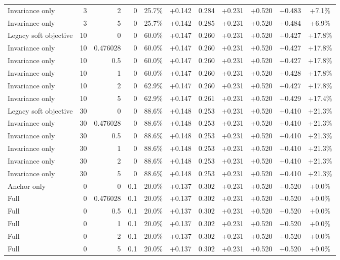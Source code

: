 \begin{table}[htbp]
\begin{tabular}{lrrrccccccc}
Invariance only & 3 & 2 & 0 & 25.7\% & +0.142 & 0.284 & +0.231 & +0.520 & +0.483 & +7.1\% \\
Invariance only & 3 & 5 & 0 & 25.7\% & +0.142 & 0.285 & +0.231 & +0.520 & +0.484 & +6.9\% \\
Legacy soft objective & 10 & 0 & 0 & 60.0\% & +0.147 & 0.260 & +0.231 & +0.520 & +0.427 & +17.8\% \\
Invariance only & 10 & 0.476028 & 0 & 60.0\% & +0.147 & 0.260 & +0.231 & +0.520 & +0.427 & +17.8\% \\
Invariance only & 10 & 0.5 & 0 & 60.0\% & +0.147 & 0.260 & +0.231 & +0.520 & +0.427 & +17.8\% \\
Invariance only & 10 & 1 & 0 & 60.0\% & +0.147 & 0.260 & +0.231 & +0.520 & +0.428 & +17.8\% \\
Invariance only & 10 & 2 & 0 & 62.9\% & +0.147 & 0.260 & +0.231 & +0.520 & +0.427 & +17.8\% \\
Invariance only & 10 & 5 & 0 & 62.9\% & +0.147 & 0.261 & +0.231 & +0.520 & +0.429 & +17.4\% \\
Legacy soft objective & 30 & 0 & 0 & 88.6\% & +0.148 & 0.253 & +0.231 & +0.520 & +0.410 & +21.3\% \\
Invariance only & 30 & 0.476028 & 0 & 88.6\% & +0.148 & 0.253 & +0.231 & +0.520 & +0.410 & +21.3\% \\
Invariance only & 30 & 0.5 & 0 & 88.6\% & +0.148 & 0.253 & +0.231 & +0.520 & +0.410 & +21.3\% \\
Invariance only & 30 & 1 & 0 & 88.6\% & +0.148 & 0.253 & +0.231 & +0.520 & +0.410 & +21.3\% \\
Invariance only & 30 & 2 & 0 & 88.6\% & +0.148 & 0.253 & +0.231 & +0.520 & +0.410 & +21.3\% \\
Invariance only & 30 & 5 & 0 & 88.6\% & +0.148 & 0.253 & +0.231 & +0.520 & +0.410 & +21.3\% \\
Anchor only & 0 & 0 & 0.1 & 20.0\% & +0.137 & 0.302 & +0.231 & +0.520 & +0.520 & +0.0\% \\
Full & 0 & 0.476028 & 0.1 & 20.0\% & +0.137 & 0.302 & +0.231 & +0.520 & +0.520 & +0.0\% \\
Full & 0 & 0.5 & 0.1 & 20.0\% & +0.137 & 0.302 & +0.231 & +0.520 & +0.520 & +0.0\% \\
Full & 0 & 1 & 0.1 & 20.0\% & +0.137 & 0.302 & +0.231 & +0.520 & +0.520 & +0.0\% \\
Full & 0 & 2 & 0.1 & 20.0\% & +0.137 & 0.302 & +0.231 & +0.520 & +0.520 & +0.0\% \\
Full & 0 & 5 & 0.1 & 20.0\% & +0.137 & 0.302 & +0.231 & +0.520 & +0.520 & +0.0\% \\

\end{tabular}
\end{table}
